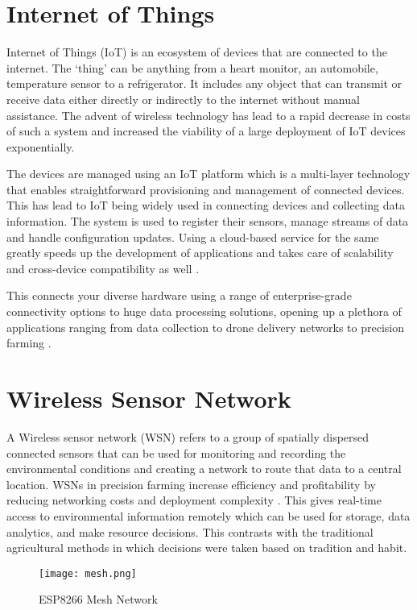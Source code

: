 \section{Internet of Things}
Internet of Things (IoT) \cite{BandaCM15} is an ecosystem of devices that are connected to the internet. The ‘thing’ can be anything from a heart monitor, an automobile, temperature sensor to a refrigerator. It includes any object that can transmit or receive data either directly or indirectly to the internet without manual assistance. The advent of wireless technology has lead to a rapid decrease in costs of such a system and increased the viability of a large deployment of IoT devices exponentially.

The devices are managed using an IoT platform which is a multi-layer technology that enables straightforward provisioning and management of connected devices. This has lead to IoT being widely used in connecting devices and collecting data information. The system is used to register their sensors, manage streams of data and handle configuration updates. Using a cloud-based service for the same greatly speeds up the development of applications and takes care of scalability and cross-device compatibility as well \cite{ref1.4}.

This connects your diverse hardware using a range of enterprise-grade connectivity options to huge data processing solutions, opening up a plethora of applications ranging from data collection to drone delivery networks to precision farming \cite{iotPAhighLevel}.

\section{Wireless Sensor Network}

A Wireless sensor network (WSN) refers to a group of spatially dispersed connected sensors that can be used for monitoring and recording the environmental conditions and creating a network to route that data to a central location. WSNs in precision farming increase efficiency and profitability by reducing networking costs and deployment complexity \cite{ref2.2}. This gives real-time access to environmental information remotely which can be used for storage, data analytics, and make resource decisions. This contrasts with the traditional agricultural methods in which decisions were taken based on tradition and habit.

\begin{figure}[!h]
  \centering
  \texttt{[image: mesh.png]}
  \caption{ESP8266 Mesh Network}
  \label{fig:mesh}
\end{figure}

